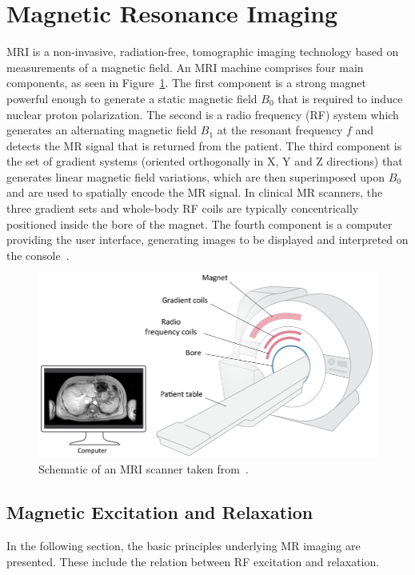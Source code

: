 \documentclass[english,version-2022-01]{uzl-thesis} %
\begin{document}
\section{Magnetic Resonance Imaging} \label{Sec:MRI}
MRI is a non-invasive, radiation-free, tomographic imaging technology based on measurements of a magnetic field.  An MRI machine comprises four main components, as seen in Figure~\ref{fig:MRISchematic}. The first component is a strong magnet powerful enough to generate a static magnetic field $B_0$ that is required to induce nuclear proton polarization. The second is a radio frequency (RF) system which generates an alternating magnetic field $B_1$ at the resonant frequency $f$ and detects the MR signal that is returned from the patient. The third component is the set of gradient systems (oriented orthogonally in X, Y and Z directions) that generates linear magnetic field variations, which are then superimposed upon $B_0$ and are used to spatially encode the MR signal. In clinical MR scanners, the three gradient sets and whole-body RF coils are typically concentrically positioned inside the bore of the magnet. The fourth component is a computer providing the user interface, generating images to be displayed and interpreted on the console~\cite{Serai2021}.

\begin{figure}[htpb]
 	\centering
 	\graphicspath{{images/}{\main/images/}}
 	\includegraphics[width=\linewidth]{MRI-Schematic.png} 
 	\caption{Schematic of an MRI scanner taken from~\cite{Serai2021}.}
 	\label{fig:MRISchematic}
 \end{figure} 

\subsection{Magnetic Excitation and Relaxation} \label{SubSec:MagneticExcitationAndRelaxation}
In the following section, the basic principles underlying MR imaging are presented. These include the relation between RF excitation and relaxation.
\end{document}
